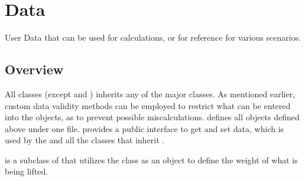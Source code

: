 \documentclass[../Documentation.tex]{subfiles}
\begin{document}
\section{Data}
User Data that can be used for calculations, or for reference for various scenarios.
\subsection{Overview}
All classes (except  and ) inherits any of the major  classes. As mentioned earlier, custom data validity methods can be employed to restrict what can be entered into the objects, as to prevent possible miscalculations.
 defines all objects defined above under one file.  provides a public interface to get and set data, which is used by the  and all the classes that inherit .

 is a subclass of  that utilizes the  class as an object to define the weight of what is being lifted.
\end{document}
